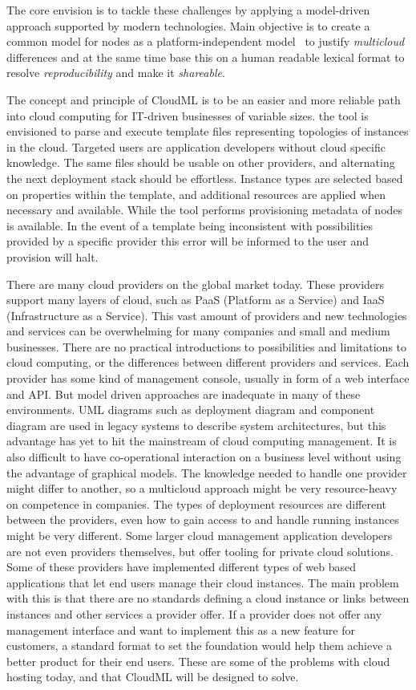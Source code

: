 
The core envision is to tackle these challenges by applying a model-driven approach supported by modern technologies.
Main objective is to create a common model for nodes as a platform-independent model~\cite{agile:cuong10}
to justify \emph{multicloud} differences and 
at the same time base this on a human readable lexical format to resolve \emph{reproducibility} and
make it \emph{shareable}.

The concept and principle of CloudML is to be an easier and more reliable
path into cloud computing for IT-driven businesses of variable sizes.
the tool is envisioned to parse and execute template files representing topologies
of instances in the cloud. Targeted users are application developers without
cloud specific knowledge. The same files should be usable on other providers,
and alternating the next deployment stack should be effortless.
Instance types are selected based on properties within the template,
and additional resources are applied when necessary and available.
While the tool performs provisioning metadata of nodes is available.
In the event of a template being inconsistent with possibilities 
provided by a specific provider this error will be informed 
to the user and provision will halt.

There are many cloud providers on the global market today. These providers support many layers of cloud, 
such as PaaS (Platform as a Service) and IaaS (Infrastructure as a Service). 
This vast amount of providers and new technologies and services can be overwhelming for many companies and small and medium businesses. 
There are no practical introductions to possibilities and limitations to cloud computing, or the differences between different providers and services. 
Each provider has some kind of management console, usually in form of a web interface and API. 
But model driven approaches are inadequate in many of these environments. 
UML diagrams such as deployment diagram and component diagram are used in legacy systems to describe system architectures, 
but this advantage has yet to hit the mainstream of cloud computing management. 
It is also difficult to have co-operational interaction on a business level without using the advantage of graphical models.
The knowledge needed to handle one provider might differ to another, so a multicloud approach might be very resource-heavy on competence in companies. 
The types of deployment resources are different between the providers, even how to gain access to and handle running instances might be very different. 
Some larger cloud management application developers are not even providers themselves, but offer tooling for private cloud solutions.
Some of these providers have implemented different types of web based applications that let end users manage their cloud instances. 
The main problem with this is that there are no standards defining a cloud instance or links between instances and other services a provider offer.
If a provider does not offer any management interface and want to implement this as a new feature for customers, 
a standard format to set the foundation would help them achieve a better product for their end users.
These are some of the problems with cloud hosting today, and that CloudML will be designed to solve.
